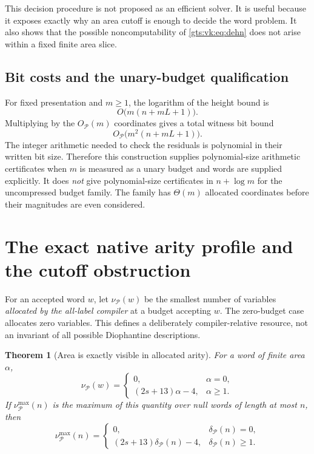 \documentclass[11pt,letterpaper]{article}
\newtheorem{theorem}{Theorem}[section]
\theoremstyle{definition}
\theoremstyle{remark}
\newcommand{\Pp}{\mathcal P}
\begin{document}
This decision procedure is not proposed as an efficient solver. It is useful because it exposes exactly why an area cutoff is enough to decide the word problem. It also shows that the possible noncomputability of \eqref{gts:vk:eq:dehn} does not arise within a fixed finite area slice.

\subsection{Bit costs and the unary-budget qualification}

For fixed presentation and $m\geq1$, the logarithm of the height bound is
\[
 O\bigl(m(n+mL+1)\bigr).
\]
Multiplying by the $O_{\Pp}(m)$ coordinates gives a total witness bit bound
\begin{equation}\label{gts:vk:eq:bitbound}
 O_{\Pp}\bigl(m^2(n+mL+1)\bigr).
\end{equation}
The integer arithmetic needed to check the residuals is polynomial in their written bit size. Therefore this construction supplies polynomial-size arithmetic certificates when $m$ is measured as a unary budget and words are supplied explicitly. It does \emph{not} give polynomial-size certificates in $n+\log m$ for the uncompressed budget family. The family has $\Theta(m)$ allocated coordinates before their magnitudes are even considered.

\section{The exact native arity profile and the cutoff obstruction}\label{gts:vk:sec:dehn}

For an accepted word $w$, let $\nu_{\Pp}(w)$ be the smallest number of variables \emph{allocated by the all-label compiler} at a budget accepting $w$. The zero-budget case allocates zero variables. This defines a deliberately compiler-relative resource, not an invariant of all possible Diophantine descriptions.

\begin{theorem}[Area is exactly visible in allocated arity]\label{gts:vk:thm:arity}
For a word of finite area $\alpha$,
\begin{equation}\label{gts:vk:eq:arity-area}
 \nu_{\Pp}(w)=
 \begin{cases}
 0,&\alpha=0,\\
 (2s+13)\alpha-4,&\alpha\geq1.
 \end{cases}
\end{equation}
If $\nu_{\Pp}^{\max}(n)$ is the maximum of this quantity over null words of length at most $n$, then
\begin{equation}\label{gts:vk:eq:arity-dehn}
 \nu_{\Pp}^{\max}(n)=
 \begin{cases}
 0,&\delta_{\Pp}(n)=0,\\
 (2s+13)\delta_{\Pp}(n)-4,&\delta_{\Pp}(n)\geq1.
 \end{cases}
\end{equation}
\end{theorem}
\end{document}
